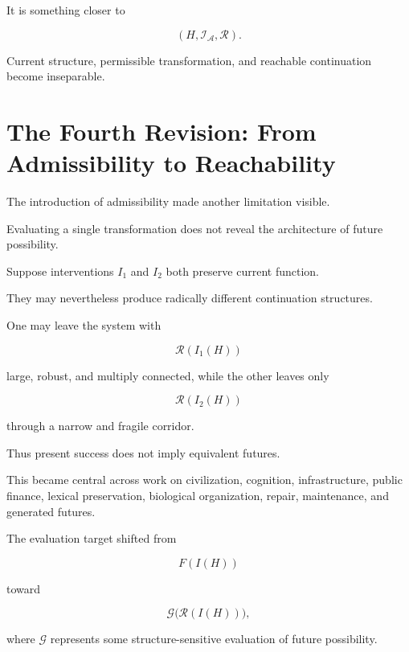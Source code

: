 \documentclass[11pt]{article}
\theoremstyle{remark}
\newcommand{\Adm}{\mathcal{A}}
\newcommand{\Reach}{\mathcal{R}}
\begin{document}
It is something closer to

\begin{equation}
(H,\mathcal{I}_{\Adm},\Reach).
\end{equation}

Current structure, permissible transformation, and reachable continuation become inseparable.

\section{The Fourth Revision: From Admissibility to Reachability}

The introduction of admissibility made another limitation visible.

Evaluating a single transformation does not reveal the architecture of future possibility.

Suppose interventions $I_1$ and $I_2$ both preserve current function.

They may nevertheless produce radically different continuation structures.

One may leave the system with

\begin{equation}
\Reach(I_1(H))
\end{equation}

large, robust, and multiply connected, while the other leaves only

\begin{equation}
\Reach(I_2(H))
\end{equation}

through a narrow and fragile corridor.

Thus present success does not imply equivalent futures.

This became central across work on civilization, cognition, infrastructure, public finance, lexical preservation, biological organization, repair, maintenance, and generated futures.

The evaluation target shifted from

\begin{equation}
F(I(H))
\end{equation}

toward

\begin{equation}
\mathcal{G}
\bigl(
\Reach(I(H))
\bigr),
\end{equation}

where $\mathcal{G}$ represents some structure-sensitive evaluation of future possibility.
\end{document}
